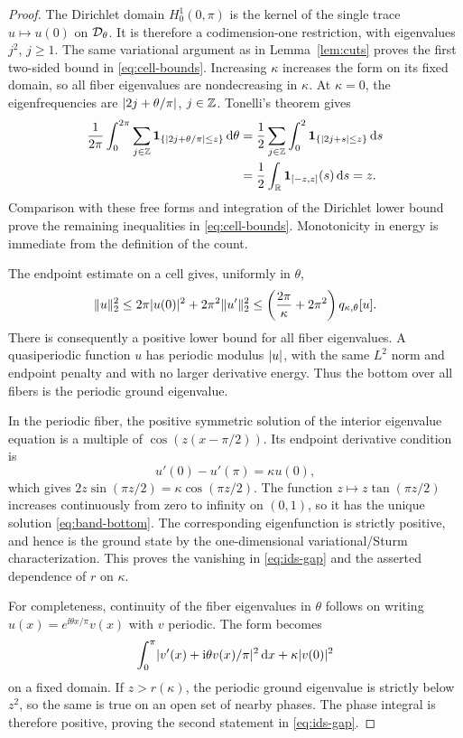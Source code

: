 \begin{proof}
The Dirichlet domain $H^1_0(0,\pi)$ is the kernel of the single
trace $u\mapsto u(0)$ on $\mathcal D_\theta$. It is therefore a
codimension-one restriction, with eigenvalues $j^2$, $j\ge1$.
The same variational argument as in Lemma~\ref{lem:cuts} proves
the first two-sided bound in \eqref{eq:cell-bounds}.
Increasing $\kappa$ increases the form on its fixed domain, so
all fiber eigenvalues are nondecreasing in $\kappa$.
At $\kappa=0$, the eigenfrequencies are
$\lvert2j+\theta/\pi\rvert$, $j\in\mathbb Z$. Tonelli's theorem gives
\begin{align*}
 \frac1{2\pi}\int_0^{2\pi}
    \sum_{j\in\mathbb Z}\mathbf 1_{\{\lvert2j+\theta/\pi\rvert\le z\}}\,\mathrm d\theta
 &=\frac12\sum_{j\in\mathbb Z}\int_0^2
                     \mathbf 1_{\{\lvert2j+s\rvert\le z\}}\,\mathrm d s\\
 &=\frac12\int_\mathbb R\mathbf 1_{[-z,z]}(s)\,\mathrm d s=z.
\end{align*}
Comparison with these free forms and integration of the Dirichlet
lower bound prove the remaining inequalities in
\eqref{eq:cell-bounds}. Monotonicity in energy is immediate from
the definition of the count.

The endpoint estimate on a cell gives, uniformly in $\theta$,
\begin{equation}
 \lVert u\rVert_2^2\le2\pi\lvert u(0)\rvert^2+2\pi^2\lVert u'\rVert_2^2
       \le\left(\frac{2\pi}{\kappa}+2\pi^2\right)
                         q_{\kappa,\theta}[u].
 \label{eq:fiber-gap-estimate}
\end{equation}
There is consequently a positive lower bound for all fiber
eigenvalues. A quasiperiodic function $u$ has periodic modulus
$\lvert u\rvert$, with the same $L^2$ norm and endpoint penalty and with
no larger derivative energy. Thus the bottom over all fibers is
the periodic ground eigenvalue.

In the periodic fiber, the positive symmetric solution of the
interior eigenvalue equation is a multiple of
$\cos(z(x-\pi/2))$. Its endpoint derivative condition is
\[
 u'(0)-u'(\pi)=\kappa u(0),
\]
which gives $2z\sin(\pi z/2)=\kappa\cos(\pi z/2)$.
The function $z\mapsto z\tan(\pi z/2)$ increases continuously
from zero to infinity on $(0,1)$, so it has the unique solution
\eqref{eq:band-bottom}. The corresponding eigenfunction is
strictly positive, and hence is the ground state by the
one-dimensional variational/Sturm characterization. This proves
the vanishing in \eqref{eq:ids-gap} and the asserted dependence
of $r$ on $\kappa$.

For completeness, continuity of the fiber eigenvalues in $\theta$
follows on writing $u(x)=e^{\ii\theta x/\pi}v(x)$ with $v$
periodic. The form becomes
\[
 \int_0^\pi\lvert v'(x)+\mathrm i\theta v(x)/\pi\rvert^2\,\mathrm d x
       +\kappa\lvert v(0)\rvert^2
\]
on a fixed domain. If $z>r(\kappa)$, the periodic ground
eigenvalue is strictly below $z^2$, so the same is true on an
open set of nearby phases. The phase integral is therefore
positive, proving the second statement in \eqref{eq:ids-gap}.
\end{proof}

